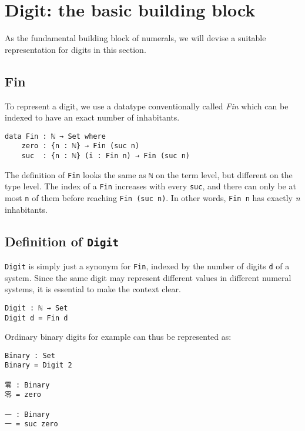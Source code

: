 \documentclass[\main/thesis.tex]{subfiles}
\begin{document}
\section{Digit: the basic building block}\label{digit}

As the fundamental building block of numerals, we will devise a suitable
representation for digits in this section.

\subsection{Fin}

To represent a digit, we use a datatype conventionally called \textit{Fin}
which can be indexed to have an exact number of inhabitants.

\begin{lstlisting}
data Fin : ℕ → Set where
    zero : {n : ℕ} → Fin (suc n)
    suc  : {n : ℕ} (i : Fin n) → Fin (suc n)
\end{lstlisting}

The definition of {\lstinline|Fin|} looks the same as {\lstinline|ℕ|} on the term
level, but different on the type level. The index of a {\lstinline|Fin|} increases
with every {\lstinline|suc|}, and there can only be at most {\lstinline|n|} of
them before reaching {\lstinline|Fin (suc n)|}. In other words, {\lstinline|Fin n|}
has exactly \textit{n} inhabitants.

\subsection{Definition of \lstinline|Digit|}

{\lstinline|Digit|} is simply just a synonym for {\lstinline|Fin|}, indexed by
the number of digits {\lstinline|d|} of a system.
Since the same digit may represent different values in different numeral systems,
it is essential to make the context clear.

\begin{lstlisting}
Digit : ℕ → Set
Digit d = Fin d
\end{lstlisting}

Ordinary binary digits for example can thus be represented as:

\begin{lstlisting}
Binary : Set
Binary = Digit 2

零 : Binary
零 = zero

一 : Binary
一 = suc zero
\end{lstlisting}
\end{document}
